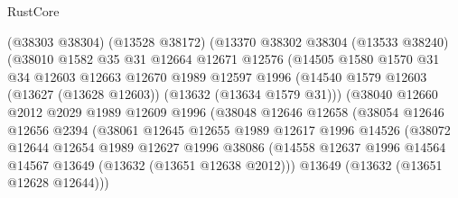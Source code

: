\begin{lexlean}{RustCore}
\begin{coremodule}
                      (@38303 @38304)
                      (@13528 @38172)
                      (@13370
                        @38302
                        @38304
                        (@13533 @38240)
                        (@38010
                          @1582
                          @35
                          @31
                          @12664
                          @12671
                          @12576
                          (@14505
                            @1580
                            @1570
                            @31
                            @34
                            @12603
                            @12663
                            @12670
                            @1989
                            @12597
                            @1996
                            (@14540
                              @1579
                              @12603
                              (@13627 (@13628 @12603))
                              (@13632 (@13634 @1579 @31)))
                            (@38040
                              @12660
                              @2012
                              @2029
                              @1989
                              @12609
                              @1996
                              (@38048
                                @12646
                                @12658
                                (@38054
                                  @12646
                                  @12656
                                  @2394
                                  (@38061
                                    @12645
                                    @12655
                                    @1989
                                    @12617
                                    @1996
                                    @14526
                                    (@38072
                                      @12644
                                      @12654
                                      @1989
                                      @12627
                                      @1996
                                      @38086
                                      (@14558
                                        @12637
                                        @1996
                                        @14564
                                        @14567
                                        @13649
                                        (@13632 (@13651 @12638 @2012)))
                                      @13649
                                      (@13632 (@13651 @12628 @12644)))

\end{coremodule}
\end{lexlean}
